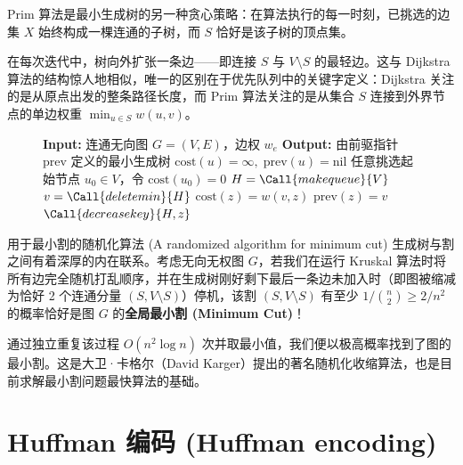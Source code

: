 Prim 算法是最小生成树的另一种贪心策略：在算法执行的每一时刻，已挑选的边集 $X$ 始终构成一棵连通的子树，而 $S$ 恰好是该子树的顶点集。

在每次迭代中，树向外扩张一条边——即连接 $S$ 与 $V \setminus S$ 的最轻边。这与 Dijkstra 算法的结构惊人地相似，唯一的区别在于优先队列中的关键字定义：Dijkstra 关注的是从原点出发的整条路径长度，而 Prim 算法关注的是从集合 $S$ 连接到外界节点的单边权重 $\min_{u \in S} w(u, v)$。

\begin{figure}[htbp]
\centering
\begin{tcolorbox}[colback=white,colframe=gray!50!black,title={\textbf{图 5.9}\quad Prim 最小生成树算法}]
\begin{algorithmic}[1]
    \State \textbf{Input:} 连通无向图 $G = (V, E)$，边权 $w_e$
    \State \textbf{Output:} 由前驱指针 $\text{prev}$ 定义的最小生成树
        \State $\text{cost}(u) = \infty,\; \text{prev}(u) = \text{nil}$
    \EndFor
    \State 任意挑选起始节点 $u_0 \in V$，令 $\text{cost}(u_0) = 0$
    \State $H = \Call{makequeue}{V}$ 
        \State $v = \Call{deletemin}{H}$
                \State $\text{cost}(z) = w(v, z)$
                \State $\text{prev}(z) = v$
                \State $\Call{decreasekey}{H, z}$
            \EndIf
        \EndFor
    \EndWhile
\EndProcedure
\end{algorithmic}
\end{tcolorbox}
\label{fig:prim_alg}
\end{figure}

\begin{sidebarbox}{用于最小割的随机化算法 (A randomized algorithm for minimum cut)}
生成树与割之间有着深厚的内在联系。考虑无向无权图 $G$，若我们在运行 Kruskal 算法时将所有边完全随机打乱顺序，并在生成树刚好剩下最后一条边未加入时（即图被缩减为恰好 2 个连通分量 $(S, V \setminus S)$）停机，该割 $(S, V \setminus S)$ 有至少 $1/\binom{n}{2} \ge 2/n^2$ 的概率恰好是图 $G$ 的\textbf{全局最小割 (Minimum Cut)}！

通过独立重复该过程 $O(n^2 \log n)$ 次并取最小值，我们便以极高概率找到了图的最小割。这是大卫·卡格尔（David Karger）提出的著名随机化收缩算法，也是目前求解最小割问题最快算法的基础。
\end{sidebarbox}

\section{Huffman 编码 (Huffman encoding)}

